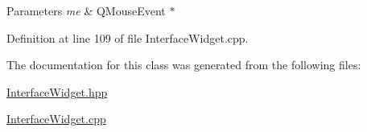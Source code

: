 \begin{DoxyParams}{\-Parameters}
{\em me} & \-Q\-Mouse\-Event $\ast$ \\
\hline
\end{DoxyParams}


\-Definition at line 109 of file \-Interface\-Widget.\-cpp.



\-The documentation for this class was generated from the following files\-:\begin{DoxyCompactItemize}
\item 
\hyperlink{_interface_widget_8hpp}{\-Interface\-Widget.\-hpp}\item 
\hyperlink{_interface_widget_8cpp}{\-Interface\-Widget.\-cpp}\end{DoxyCompactItemize}
